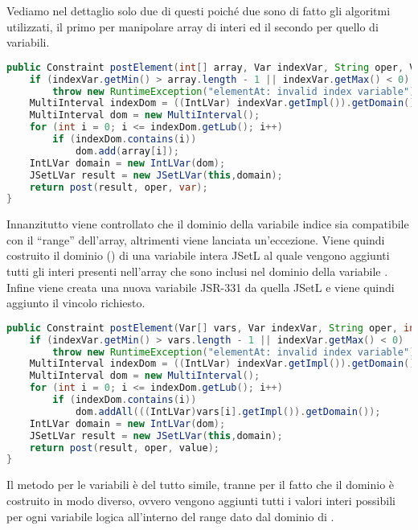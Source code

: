 Vediamo nel dettaglio solo due di questi poiché due sono di fatto gli algoritmi
utilizzati, il primo per manipolare array di interi ed il secondo per
quello di variabili.

\begin{lstlisting}[language = Java,
                   caption = {\files{postElement}, array di interi.}]
public Constraint postElement(int[] array, Var indexVar, String oper, Var var) {
	if (indexVar.getMin() > array.length - 1 || indexVar.getMax() < 0)
		throw new RuntimeException("elementAt: invalid index variable");
	MultiInterval indexDom = ((IntLVar) indexVar.getImpl()).getDomain();
	MultiInterval dom = new MultiInterval();
	for (int i = 0; i <= indexDom.getLub(); i++)
		if (indexDom.contains(i))
			dom.add(array[i]);
	IntLVar domain = new IntLVar(dom);
	JSetLVar result = new JSetLVar(this,domain);
	return post(result, oper, var);
}
\end{lstlisting}
Innanzitutto viene controllato che il dominio della variabile indice sia
compatibile con il ``range'' dell'array, altrimenti viene lanciata un'eccezione.
Viene quindi costruito il dominio () di una variabile intera
JSetL al quale vengono aggiunti tutti gli interi presenti nell'array che sono
inclusi nel dominio della variabile . Infine viene creata una
nuova variabile JSR-331 da quella JSetL e viene quindi aggiunto il vincolo
richiesto.

\begin{lstlisting}[language = Java,
                   caption = {\files{postElement}, array di variabili.}]
public Constraint postElement(Var[] vars, Var indexVar, String oper, int value) {
	if (indexVar.getMin() > vars.length - 1 || indexVar.getMax() < 0)
		throw new RuntimeException("elementAt: invalid index variable");
	MultiInterval indexDom = ((IntLVar) indexVar.getImpl()).getDomain();
	MultiInterval dom = new MultiInterval();
	for (int i = 0; i <= indexDom.getLub(); i++)
		if (indexDom.contains(i))
			dom.addAll(((IntLVar)vars[i].getImpl()).getDomain());
	IntLVar domain = new IntLVar(dom);
	JSetLVar result = new JSetLVar(this,domain);
	return post(result, oper, value);
}
\end{lstlisting}
Il metodo per le variabili è del tutto simile, tranne per il fatto che il
dominio è costruito in modo diverso, ovvero vengono aggiunti tutti i valori
interi possibili per ogni variabile logica all'interno del range dato dal
dominio di .


